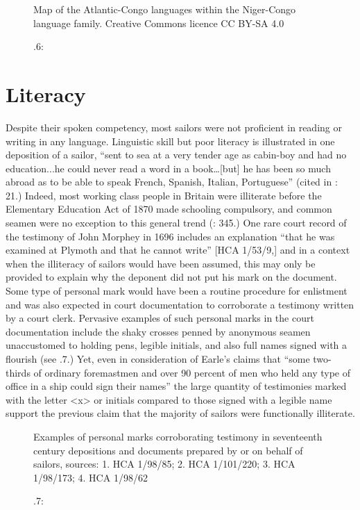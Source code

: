   
\begin{figure}
 

{\caption{\label{fig:key:3}.6:}}{ Map of the Atlantic-Congo languages within the Niger-Congo language family. Creative Commons licence CC BY-SA 4.0} 
\end{figure}

\section{{Literacy}}%

  Despite their spoken competency, most sailors were not proficient in reading or writing in any language. Linguistic skill but poor literacy is illustrated in one deposition of a sailor, “sent to sea at a very tender age as cabin-boy and had no education...he could never read a word in a book…[but] he has been so much abroad as to be able to speak French, Spanish, Italian, Portuguese” (cited in \citealt{Earle1998}: 21.) Indeed, most working class people in Britain were illiterate before the Elementary Education Act of 1870 made schooling compulsory, and common seamen were no exception to this general trend (\citealt{AdkinsAdkins2008}: 345.) One rare court record of the testimony of John Morphey in 1696 includes an explanation “that he was examined at Plymoth and that he cannot write” [HCA 1/53/9,] and in a context when the illiteracy of sailors would have been assumed, this may only be provided to explain why the deponent did not put his mark on the document. Some type of personal mark would have been a routine procedure for enlistment and was also expected in court documentation to corroborate a testimony written by a court clerk. Pervasive examples of such personal marks in the court documentation include the shaky crosses penned by anonymous seamen unaccustomed to holding pens, legible initials, and also full names signed with a flourish (see .7.) Yet, even in consideration of Earle’s claims that “some two-thirds of ordinary foremastmen and over 90 percent of men who held any type of office in a ship could sign their names” \citep[20,]{Earle1998} the large quantity of testimonies marked with the letter <x> or initials compared to those signed with a legible name support the previous claim that the majority of sailors were functionally illiterate. 

\begin{figure}
  
 

\caption{\label{fig:key:3}.7:} Examples of personal marks corroborating testimony in seventeenth century depositions and documents prepared by or on behalf of sailors, sources: 1. HCA 1/98/85; 2. HCA 1/101/220; 3. HCA 1/98/173; 4. HCA 1/98/62
\end{figure}

